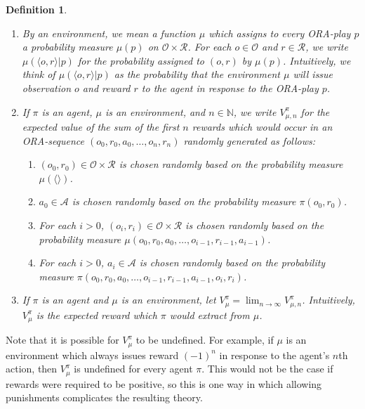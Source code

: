 \documentclass{article}
\newtheorem{definition}[theorem]{Definition}
\begin{document}
\begin{definition}
\begin{enumerate}
        will take action $a$ in response to the ORA-prompt $p$.
        \item
        By an \emph{environment}, we mean a function $\mu$
        which assigns to every ORA-play $p$ a probability measure $\mu(p)$
        on $\mathcal O\times\mathcal R$.
        For each $o\in\mathcal O$ and $r\in\mathcal R$, we write $\mu(\langle o,r\rangle|p)$
        for the probability assigned to $(o,r)$ by $\mu(p)$.
        Intuitively, we think of $\mu(\langle o,r\rangle|p)$ as the
        probability that the environment
        $\mu$ will issue observation $o$ and reward $r$ to the agent in response
        to the ORA-play $p$.
        \item
        If $\pi$ is an agent, $\mu$ is an environment, and $n\in\mathbb N$,
        we write $V^\pi_{\mu,n}$ for the expected value of the sum of
        the first $n$ rewards which would occur in an ORA-sequence
        $(o_0,r_0,a_0,\ldots,o_n,r_n)$ randomly generated as follows:
        \begin{enumerate}
            \item $(o_0,r_0)\in \mathcal O\times\mathcal R$ is chosen randomly based
            on the probability measure $\mu(\langle\rangle)$.
            \item $a_0\in\mathcal A$ is chosen randomly based on the probability
            measure $\pi(o_0,r_0)$.
            \item
            For each $i>0$,
            $(o_i,r_i)\in\mathcal O\times\mathcal R$ is chosen randomly based on
            the probability measure $\mu(o_0,r_0,a_0,\ldots,o_{i-1},r_{i-1},a_{i-1})$.
            \item
            For each $i>0$,
            $a_i\in\mathcal A$ is chosen randomly based on the probability measure
            $\pi(o_0,r_0,a_0,\ldots,o_{i-1},r_{i-1},a_{i-1},o_i,r_i)$.
        \end{enumerate}
        \item
        If $\pi$ is an agent and $\mu$ is an environment,
        let $V^\pi_\mu=\lim_{n\to\infty}V^{\pi}_{\mu,n}$.
        Intuitively, $V^\pi_\mu$ is the expected reward which $\pi$ would extract
        from $\mu$.
    \end{enumerate}
\end{definition}

Note that it is possible for $V^\pi_\mu$ to be undefined.
For example, if $\mu$ is an environment which always issues
reward $(-1)^n$ in response to the agent's $n$th action,
then $V^\pi_\mu$ is undefined for every agent $\pi$.
This would not be the case if rewards were required to be positive,
so this is one way in which allowing
punishments complicates the resulting theory.
\end{document}
